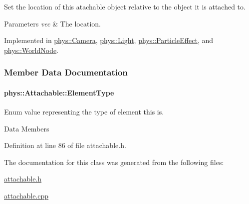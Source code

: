 Set the location of this atachable object relative to the object it is attached to. 


\begin{DoxyParams}{Parameters}
{\em vec} & The location. \\
\hline
\end{DoxyParams}


Implemented in \hyperlink{classphys_1_1Camera_afd2a77e96dd6d0dec1071dcc3229425f}{phys::Camera}, \hyperlink{classphys_1_1Light_adf0d72c9ad1b0cff94bd7f4cba987750}{phys::Light}, \hyperlink{classphys_1_1ParticleEffect_a4371533c2d1d533208b7bc8a067a67e5}{phys::ParticleEffect}, and \hyperlink{classphys_1_1WorldNode_af276da0d87f4ddc1405bc87b9e2e034d}{phys::WorldNode}.



\subsubsection{Member Data Documentation}
\hypertarget{classphys_1_1Attachable_af574d5f08a304c6e0ae002bb2fc057c7}{
\paragraph[{ElementType}]{ {\bf phys::Attachable::ElementType}}\hfill}
\label{df/dbd/classphys_1_1Attachable_af574d5f08a304c6e0ae002bb2fc057c7}


Enum value representing the type of element this is. 

Data Members 

Definition at line 86 of file attachable.h.



The documentation for this class was generated from the following files:\begin{DoxyCompactItemize}
\item 
\hyperlink{attachable_8h}{attachable.h}\item 
\hyperlink{attachable_8cpp}{attachable.cpp}\end{DoxyCompactItemize}
